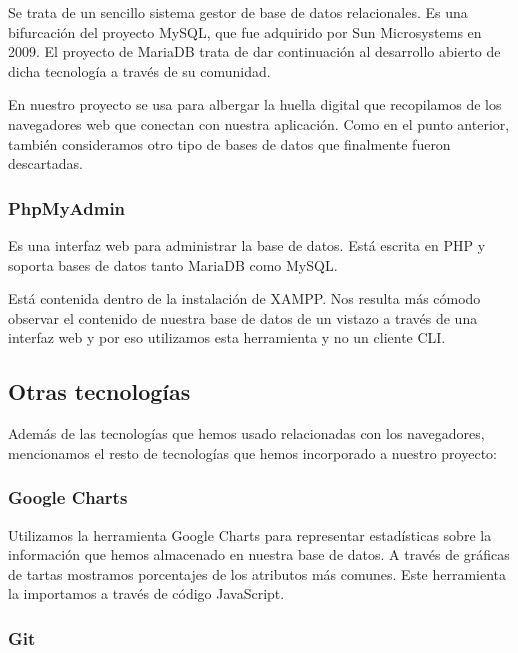 Se trata de un sencillo sistema gestor de base de datos relacionales. Es una bifurcación del proyecto MySQL, que fue adquirido por Sun Microsystems en 2009. El proyecto de MariaDB trata de dar continuación al desarrollo abierto de dicha tecnología a través de su comunidad. \par 

En nuestro proyecto se usa para albergar la huella digital que recopilamos de los navegadores web que conectan con nuestra aplicación. Como en el punto anterior, también consideramos otro tipo de bases de datos que finalmente fueron descartadas. \par 

\subsubsection{PhpMyAdmin}

Es una interfaz web para administrar la base de datos. Está escrita en PHP y soporta bases de datos tanto MariaDB como MySQL. \par 

Está contenida dentro de la instalación de XAMPP. Nos resulta más cómodo observar el contenido de nuestra base de datos de un vistazo a través de una interfaz web y por eso utilizamos esta herramienta y no un cliente CLI. \par 

\subsection{Otras tecnologías}

Además de las tecnologías que hemos usado relacionadas con los navegadores, mencionamos el resto de tecnologías que hemos incorporado a nuestro proyecto: \par 

\subsubsection{Google Charts}

Utilizamos la herramienta Google Charts \cite{GoogleCharts} para representar estadísticas sobre la información que hemos almacenado en nuestra base de datos. A través de gráficas de tartas mostramos porcentajes de los atributos más comunes. Este herramienta la importamos a través de código JavaScript. \par 

\subsubsection{Git}

